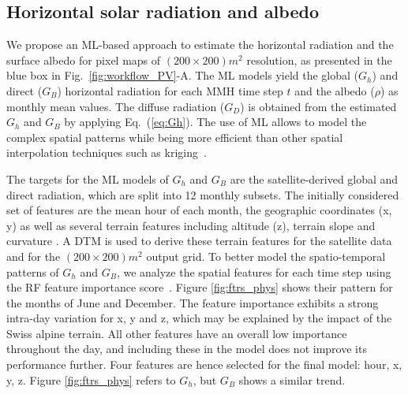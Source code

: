 \subsection{Horizontal solar radiation and albedo}
\label{irrad}

We propose an ML-based approach to estimate the horizontal radiation and the surface albedo for pixel maps of $(200 \times 200) m^2$ resolution, as presented in the blue box in Fig.~\ref{fig:workflow_PV}-A.
The ML models yield the global ($G_h$) and direct ($G_B$) horizontal radiation for each MMH time step $t$ and the albedo ($\rho$) as monthly mean values. 
The diffuse radiation ($G_D$) is obtained from the estimated $G_h$ and $G_B$ by applying Eq.~(\ref{eq:Gh}). 
The use of ML allows to model the complex spatial patterns while being more efficient than other spatial interpolation techniques such as kriging~\cite{rehman_spatial_2000}. 

The targets for the ML models of $G_h$ and $G_B$ are the satellite-derived global and direct radiation, which are split into 12 monthly subsets.
The initially considered set of features are the mean hour of each month, the geographic coordinates (x, y) as well as several terrain features including altitude (z), terrain slope and curvature \cite{robert_spatial_2012}. 
A DTM is used to derive these terrain features for the satellite data and for the $(200 \times 200) m^2$ output grid. 
To better model the spatio-temporal patterns of $G_h$ and $G_B$, we analyze the spatial features for each time step using the RF feature importance score~\cite{pedregosa_scikit-learn:_2011}.
Figure \ref{fig:ftrs_phys} shows their pattern for the months of June and December.
The feature importance exhibits a strong intra-day variation for x, y and z, which may be explained by the impact of the Swiss alpine terrain. All other features have an overall low importance throughout the day, and including these in the model does not improve its performance further.
Four features are hence selected for the final model: hour, x, y, z.
Figure \ref{fig:ftrs_phys} refers to $G_h$, but $G_B$ shows a similar trend.

